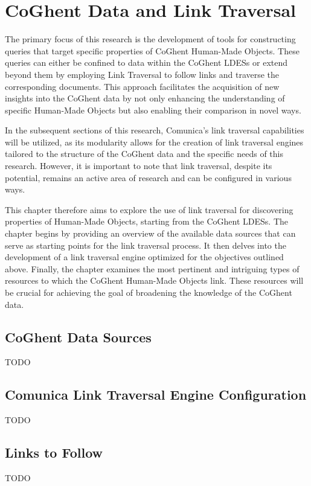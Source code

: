 \chapter{CoGhent Data and Link Traversal}
\label{chap:coghent_link_traversal}

The primary focus of this research is the development of tools for constructing queries that target specific properties of CoGhent Human-Made Objects. These queries can either be confined to data within the CoGhent LDESs or extend beyond them by employing Link Traversal to follow links and traverse the corresponding documents. This approach facilitates the acquisition of new insights into the CoGhent data by not only enhancing the understanding of specific Human-Made Objects but also enabling their comparison in novel ways.

In the subsequent sections of this research, Comunica's link traversal capabilities will be utilized, as its modularity allows for the creation of link traversal engines tailored to the structure of the CoGhent data and the specific needs of this research. However, it is important to note that link traversal, despite its potential, remains an active area of research and can be configured in various ways.

This chapter therefore aims to explore the use of link traversal for discovering properties of Human-Made Objects, starting from the CoGhent LDESs. The chapter begins by providing an overview of the available data sources that can serve as starting points for the link traversal process. It then delves into the development of a link traversal engine optimized for the objectives outlined above. Finally, the chapter examines the most pertinent and intriguing types of resources to which the CoGhent Human-Made Objects link. These resources will be crucial for achieving the goal of broadening the knowledge of the CoGhent data.

\section{CoGhent Data Sources}
\label{sec:coghent_data_sources}

TODO

\section{Comunica Link Traversal Engine Configuration}
\label{sec:comunica_link_traversal_engine_configuration}

TODO

\section{Links to Follow}
\label{sec:links_to_follow}

TODO